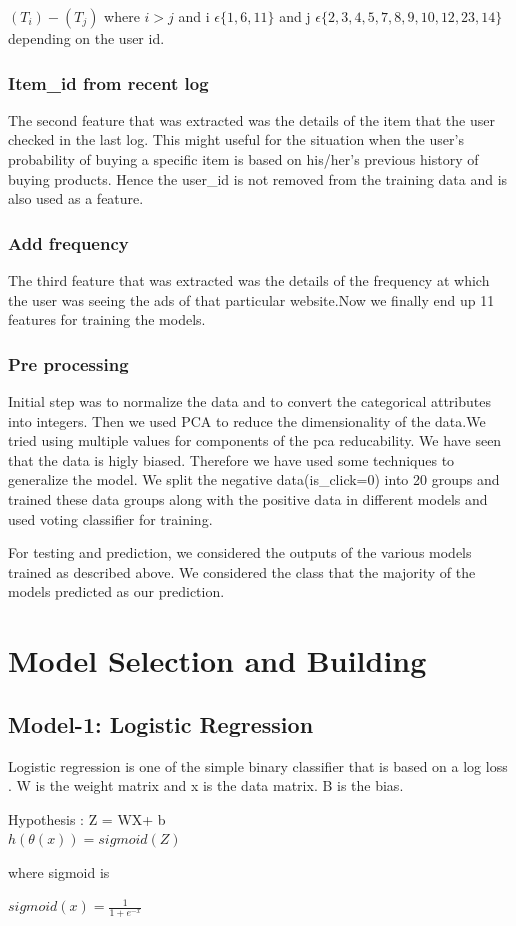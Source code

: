 \documentclass{scrreprt}
\begin{document}
$(T_i) - (T_j)$ where $i>j$ and i $\epsilon \{1,6,11\}$ and j $\epsilon \{2,3,4,5,7,8,9,10,12,23,14\}$ depending on the user id.
					
					
\subsection{Item_id from recent log}
The second feature that was extracted was the details of the item that the user checked in the last log. This might useful for the situation when the user's probability of buying a specific item is based on his/her's previous history of buying products.
Hence the user_id is not removed from the training data and is also used as a feature.

\subsection{Add frequency}
The third feature that was extracted was the details of the frequency at which the user was seeing the ads of that particular website.Now we finally end up 11 features for training the models. 

\subsection{Pre processing}
Initial step was to normalize the data and to convert the categorical attributes into integers.
Then we used PCA to reduce the dimensionality of the data.We tried using multiple values for components of the pca reducability. 
We have seen that the data is higly biased. Therefore we have used some techniques to generalize the model.
We split the negative data(is_click=0) into 20 groups and trained these data groups along with the positive data in different models and used voting classifier for training. 

For testing and prediction, we considered the outputs of the various models trained as described above. We considered the class that the majority of the models predicted as our prediction.
\chapter{Model Selection and Building} 


\section{Model-1: Logistic Regression}
Logistic regression is one of the simple binary classifier that is based on a log loss .
W is the weight matrix and x is the data matrix. B is the bias.
\begin{center}
	Hypothesis : Z = WX+ b
	\\
	$h(\theta(x))  = sigmoid(Z)$ 
	\\
\end{center}
	where sigmoid is 
\begin{center} 
		$sigmoid(x) = \frac{1}{1+e^{-x}}$
\end{center}
\end{document}
